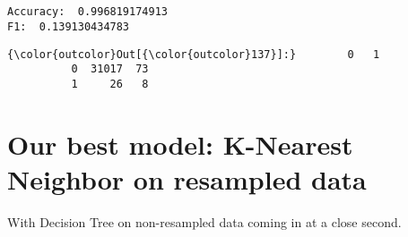 \documentclass[11pt]{article}
\begin{document}
    \begin{Verbatim}[commandchars=\\\{\}]


Accuracy:  0.996819174913
F1:  0.139130434783

    \end{Verbatim}

\begin{Verbatim}[commandchars=\\\{\}]
{\color{outcolor}Out[{\color{outcolor}137}]:}        0   1
          0  31017  73
          1     26   8
\end{Verbatim}
            
    \hypertarget{our-best-model-k-nearest-neighbor-on-resampled-data}{%
\section{Our best model: K-Nearest Neighbor on resampled
data}\label{our-best-model-k-nearest-neighbor-on-resampled-data}}

With Decision Tree on non-resampled data coming in at a close second.


    
    
    
    
\end{document}
